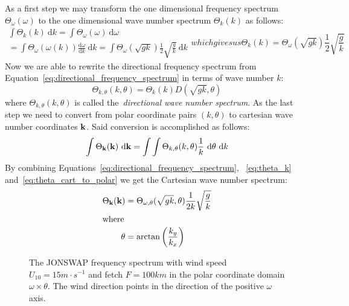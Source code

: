 As a first step we may transform the one dimensional frequency spectrum 
$\Theta_{\omega}(\omega)$ to the one dimensional wave number 
spectrum $\Theta_k(k)$ as follows:
\begin{subequations}
\begin{multline}
 \int\Theta_k(k)~\mathrm{d}k = \int\Theta_{\omega}(\omega)~\mathrm{d}\omega\\ = 
\int\Theta_{\omega}(\omega(k))\frac{\mathrm{d}\omega}{\mathrm{d}k}~\mathrm{d}k
= \int\Theta_{\omega}(\sqrt{gk})\frac{1}{2}\sqrt{\frac{g}{k}}~\mathrm{d}k
\end{multline}
which gives us
\begin{equation}
\label{eq:theta_k}
 \Theta_k(k) = \Theta_{\omega}(\sqrt{gk})\frac{1}{2}\sqrt{\frac{g}{k}}
\end{equation}
\end{subequations}
Now we are able to rewrite the directional frequency spectrum from 
Equation~\ref{eq:directional_frequency_spectrum} in terms of wave number $k$:
%
\begin{equation}
\label{eq:theta_k_polar}
 \Theta_{k,\theta}(k,\theta) = \Theta_k(k)D(\sqrt{gk},\theta)
\end{equation}
%
where $\Theta_{k,\theta}(k,\theta)$ is called the~\emph{directional wave number 
spectrum}. As the last step we need to convert from polar coordinate pairs 
$(k,\theta)$ to cartesian wave number coordinates $\mathbf{k}$. Said conversion 
is accomplished as follows:
%
\begin{equation}
\label{eq:theta_cart_to_polar}
\int\Theta_{\mathbf{k}}(\mathbf{k})~\mathrm{d}\mathbf{k} = 
\int\int\Theta_{k,\theta}(k,\theta)\frac{1}{k}~\mathrm{d}\theta~\mathrm{d}k
\end{equation}
%
By combining Equations~\ref{eq:directional_frequency_spectrum}, 
~\ref{eq:theta_k} and~\ref{eq:theta_cart_to_polar} we get the Cartesian wave 
number spectrum:
%
\begin{align}
\Theta_{\mathbf{k}}(\mathbf{k}) &= \Theta_{\omega,\theta}(\sqrt{gk}, 
\theta)\frac{1}{2k}\sqrt{\frac{g}{k}}\\
\intertext{where}
\theta &= \arctan\left(\frac{k_y}{k_x}\right)
\end{align}
%
\begin{figure}
\centering
{}
\caption{The JONSWAP frequency spectrum with wind speed $U_{10} = 15m\cdot 
s^{-1}$ and fetch $F = 100km$ in the polar coordinate domain $\omega \times 
\theta$. The wind direction points in the direction of the positive $\omega$ 
axis.}
\label{fig:brakdilala}
\end{figure}
